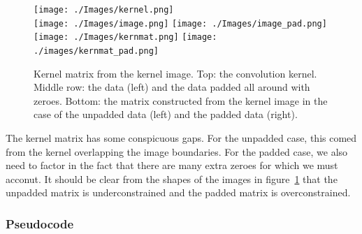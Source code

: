 \documentclass[letterpaper, 11pt]{article}
\begin{document}
\begin{figure}[h]
	\centering
	\texttt{[image: ./Images/kernel.png]}\\\vspace{1mm}
	\texttt{[image: ./Images/image.png]}
	\texttt{[image: ./Images/image\_pad.png]}\\\vspace{1mm}
	\texttt{[image: ./Images/kernmat.png]}
	\texttt{[image: ./images/kernmat\_pad.png]}
	\caption{Kernel matrix from the kernel image. Top: the convolution kernel. Middle row: the data (left) and the data padded all around with zeroes. Bottom: the matrix constructed from the kernel image in the case of the unpadded data (left) and the padded data (right).}
	\label{fig:kernmat_pad}
\end{figure}

The kernel matrix has some conspicuous gaps. For the unpadded case, this comed from the kernel overlapping the image boundaries. For the padded case, we also need to factor in the fact that there are many extra zeroes for which we must acconut. It should be clear from the shapes of the images in figure~\ref{fig:kernmat_pad} that the unpadded matrix is underconstrained and the padded matrix is overconstrained.

\subsubsection{Pseudocode}
\label{sec:decon_pseudocode}
\end{document}
